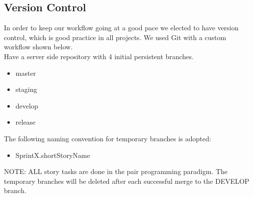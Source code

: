 \subsection{Version Control}
\label{sec:git}

In order to keep our workflow going at a good pace we elected to have version control, which is good practice in all projects. We used Git with a custom workflow shown below. \\

Have a server side repository with 4 initial persistent branches.
\begin{itemize}
\item master
\item staging
\item develop
\item release
\end{itemize}

The following naming convention for temporary branches is adopted: 

\begin{itemize}
\item SprintX.shortStoryName
\end{itemize}

NOTE: ALL story tasks are done in the pair programming paradigm. The temporary branches will be deleted after each successful merge to the DEVELOP branch.

